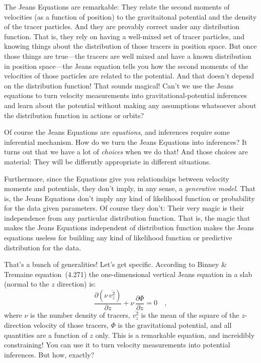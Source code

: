 \documentclass[12pt,letterpaper]{article}
\newcommand{\equationname}{equation}
\begin{document}
The Jeans Equations are remarkable: They relate the second moments of
velocities (as a function of position) to the gravitaitonal potential
and the density of the tracer particles.
And they are provably correct under any distribution function.
That is, they rely on having a well-mixed set of tracer particles,
and knowing things about the distribution of those tracers in position space.
But once those things are true---the tracers are well mixed and have a known
distribution in position space---the Jeans equation tells you how the second
moments of the velocities of those particles are related to the potential.
And that doesn't depend on the distribution function!
That sounds magical!
Can't we use the Jeans equations to turn velocity measurements into
gravitational-potential inferences and learn about the potential without
making any assumptions whatsoever about the distribution function in
actions or orbits?

Of course the Jeans Equations are \emph{equations}, and inferences require
some inferential mechanism.
How do we turn the Jeans Equations into inferences?
It turns out that we have a lot of \emph{choices} when we do that!
And those choices are material: They will be differntly appropriate in
different situations.

Furthermore, since the Equations give you relationships between velocity moments
and potentials, they don't imply, in any sense, a \emph{generative model}.
That is, the Jeans Equations don't imply any kind of likelihood function or
probability for the data given parameters.
Of course they don't: Their very magic is their independence from any particular
distribution function.
That is, the magic that makes the Jeans Equations independent of distribution
function makes the Jeans equations useless for building any kind of likelihood
function or predictive distribution for the data.

That's a bunch of generalities! Let's get specific.
According to Binney \& Tremaine \equationname~(4.271) the one-dimensional vertical
Jeans equation in a slab (normal to the $z$ direction) is:
\begin{equation}
\frac{\partial(\nu\,\overline{v_z^2})}{\partial z} + \nu\,\frac{\partial\Phi}{\partial z} = 0
\quad ,
\end{equation}
where
$\nu$ is the number density of tracers,
$\overline{v_z^2}$ is the mean of the square of the $z$-direction velocity of those tracers,
$\Phi$ is the gravitational potential,
and all quantities are a function of $z$ only.
This is a remarkable equation, and increidibly constraining!
You can use it to turn velocity measurements into potential inferences.
But how, exactly?
\end{document}
